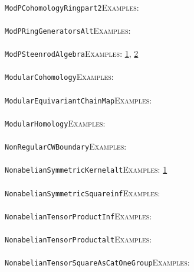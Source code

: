 \documentclass[a4paper,11pt]{report}
\begin{document}
{{ \\
 \texttt{ModPCohomologyRing{\textunderscore}part{\textunderscore}2}{\nobreakspace}{\nobreakspace}{\nobreakspace}{\nobreakspace}\textsc{Examples:} \\
 \\
 \texttt{ModPRingGeneratorsAlt}{\nobreakspace}{\nobreakspace}{\nobreakspace}{\nobreakspace}\textsc{Examples:} \\
 \\
 \texttt{ModPSteenrodAlgebra}{\nobreakspace}{\nobreakspace}{\nobreakspace}{\nobreakspace}\textsc{Examples:} \href{tutorial/chap7.html} {1}{\nobreakspace}, \href{../www/SideLinks/About/aboutModPRings.html} {2}{\nobreakspace} \\
 \\
 \texttt{ModularCohomology}{\nobreakspace}{\nobreakspace}{\nobreakspace}{\nobreakspace}\textsc{Examples:} \\
 \\
 \texttt{ModularEquivariantChainMap}{\nobreakspace}{\nobreakspace}{\nobreakspace}{\nobreakspace}\textsc{Examples:} \\
 \\
 \texttt{ModularHomology}{\nobreakspace}{\nobreakspace}{\nobreakspace}{\nobreakspace}\textsc{Examples:} \\
 \\
 \texttt{NonRegularCWBoundary}{\nobreakspace}{\nobreakspace}{\nobreakspace}{\nobreakspace}\textsc{Examples:} \\
 \\
 \texttt{NonabelianSymmetricKernel{\textunderscore}alt}{\nobreakspace}{\nobreakspace}{\nobreakspace}{\nobreakspace}\textsc{Examples:} \href{../www/SideLinks/About/aboutIntro.html} {1}{\nobreakspace} \\
 \\
 \texttt{NonabelianSymmetricSquare{\textunderscore}inf}{\nobreakspace}{\nobreakspace}{\nobreakspace}{\nobreakspace}\textsc{Examples:} \\
 \\
 \texttt{NonabelianTensorProduct{\textunderscore}Inf}{\nobreakspace}{\nobreakspace}{\nobreakspace}{\nobreakspace}\textsc{Examples:} \\
 \\
 \texttt{NonabelianTensorProduct{\textunderscore}alt}{\nobreakspace}{\nobreakspace}{\nobreakspace}{\nobreakspace}\textsc{Examples:} \\
 \\
 \texttt{NonabelianTensorSquareAsCatOneGroup}{\nobreakspace}{\nobreakspace}{\nobreakspace}{\nobreakspace}\textsc{Examples:} \\
}}
\end{document}
